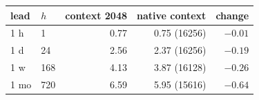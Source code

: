 \begin{tabular}{llrrr}
\toprule
lead & $h$ & context 2048 & native context & change \\
\midrule
1 h & 1 & 0.77 & 0.75 (16256) & $-0.01$ \\
1 d & 24 & 2.56 & 2.37 (16256) & $-0.19$ \\
1 w & 168 & 4.13 & 3.87 (16128) & $-0.26$ \\
1 mo & 720 & 6.59 & 5.95 (15616) & $-0.64$ \\
\bottomrule
\end{tabular}
